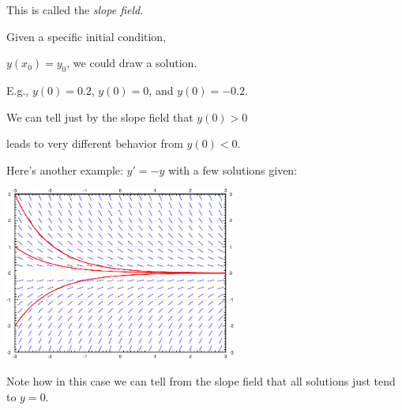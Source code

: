\documentclass[10pt,aspectratio=169]{beamer}
\begin{document}
\begin{frame}
\vspace*{-1.3in}
\pause

This is called the \emph{slope field}.

\pause
\medskip

Given a specific initial condition,

$y(x_0)=y_0$, we could draw a solution.

\pause
\medskip

E.g., $y(0) = 0.2$, $y(0) = 0$, and $y(0) = -0.2$.

\vspace*{-107pt}
\hspace*{3in}

\pause
\vspace*{-0.33in}

We can tell just by the slope field that $y(0) > 0$

leads to very different behavior from $y(0) < 0$.

\end{frame}

\begin{frame}

Here's another example: $y'=-y$ with a few solutions given:

\begin{center}
\includegraphics[width=3in]{../figures/1-3-mysl-sol}
\end{center}

\pause

Note how in this case we can tell from the slope field
that all solutions just tend to $y=0$.
\end{frame}
\end{document}
